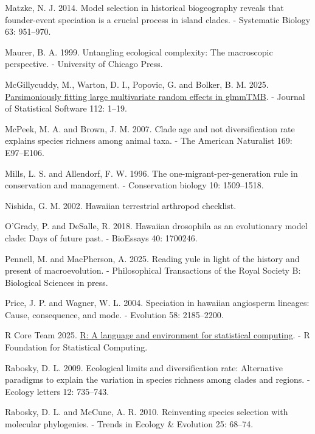 \documentclass[
  letterpaper,
  DIV=11,
  numbers=noendperiod]{scrartcl}
\newlength{\cslhangindent}
\newenvironment{CSLReferences}[2] %
 {\begin{list}{}{%
  \setlength{\itemindent}{0pt}
  \setlength{\leftmargin}{0pt}
  \setlength{\parsep}{0pt}
  \ifodd #1
   \setlength{\leftmargin}{\cslhangindent}
   \setlength{\itemindent}{-1\cslhangindent}
  \fi
  \setlength{\itemsep}{#2\baselineskip}}}
 {\end{list}}
\begin{document}
\begin{CSLReferences}{1}{1}
Matzke, N. J. 2014. Model selection in historical biogeography reveals
that founder-event speciation is a crucial process in island clades. -
Systematic Biology 63: 951--970.

Maurer, B. A. 1999. Untangling ecological complexity: The macroscopic
perspective. - University of Chicago Press.

McGillycuddy, M., Warton, D. I., Popovic, G. and Bolker, B. M. 2025.
\href{https://doi.org/10.18637/jss.v112.i01}{Parsimoniously fitting
large multivariate random effects in {glmmTMB}}. - Journal of
Statistical Software 112: 1--19.

McPeek, M. A. and Brown, J. M. 2007. Clade age and not diversification
rate explains species richness among animal taxa. - The American
Naturalist 169: E97--E106.

Mills, L. S. and Allendorf, F. W. 1996. The one-migrant-per-generation
rule in conservation and management. - Conservation biology 10:
1509--1518.

Nishida, G. M. 2002. Hawaiian terrestrial arthropod checklist.

O'Grady, P. and DeSalle, R. 2018. Hawaiian drosophila as an evolutionary
model clade: Days of future past. - BioEssays 40: 1700246.

Pennell, M. and MacPherson, A. 2025. Reading yule in light of the
history and present of macroevolution. - Philosophical Transactions of
the Royal Society B: Biological Sciences in press.

Price, J. P. and Wagner, W. L. 2004. Speciation in hawaiian angiosperm
lineages: Cause, consequence, and mode. - Evolution 58: 2185--2200.

R Core Team 2025. \href{https://www.R-project.org/}{R: A language and
environment for statistical computing}. - R Foundation for Statistical
Computing.

Rabosky, D. L. 2009. Ecological limits and diversification rate:
Alternative paradigms to explain the variation in species richness among
clades and regions. - Ecology letters 12: 735--743.

Rabosky, D. L. and McCune, A. R. 2010. Reinventing species selection
with molecular phylogenies. - Trends in Ecology \& Evolution 25: 68--74.


\end{CSLReferences}
\end{document}
